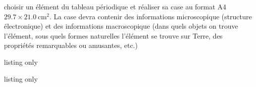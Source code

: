 \documentclass[12pt]{extarticle}
\begin{document}
\begin{boiteCodeTex}{}
  \newpage
  \nomPrenomClasse
  
  
  \begin{programmeSeance}
    \seance \seance \seance
  \end{programmeSeance}
  
  \begin{programmeSeance}
    \seance \seance
  \end{programmeSeance}
  
  \begin{programmeSeance}[nombre = 2, distance = 0 pt]
  \end{programmeSeance}
  
  \begin{tacheFinale}
     choisir un élément du tableau périodique et réaliser sa case au format A4 $\num{29,7} \times \qty{21,0}{\cm\squared}$.
    La case devra contenir des informations microscopique (structure électronique) et des informations macroscopique (dans quels objets on trouve l'élément, sous quels formes naturelles l'élément se trouve sur Terre, des propriétés remarquables ou amusantes, etc.)
  \end{tacheFinale}
\end{boiteCodeTex}



\begin{boiteCodeTex}{listing only}
\end{boiteCodeTex}




\begin{boiteCodeTex}{listing only}
\end{boiteCodeTex}

\end{document}
